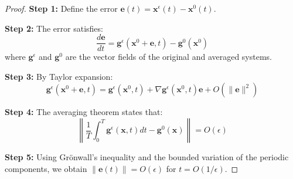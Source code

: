 \documentclass{article}
\begin{document}
\begin{proof}
\textbf{Step 1:} Define the error $\mathbf{e}(t) = \mathbf{x}^\epsilon(t) - \mathbf{x}^0(t)$.

\textbf{Step 2:} The error satisfies:
\begin{equation}
\frac{d\mathbf{e}}{dt} = \mathbf{g}^\epsilon(\mathbf{x}^0 + \mathbf{e}, t) - \mathbf{g}^0(\mathbf{x}^0)
\end{equation}
where $\mathbf{g}^\epsilon$ and $\mathbf{g}^0$ are the vector fields of the original and averaged systems.

\textbf{Step 3:} By Taylor expansion:
\begin{equation}
\mathbf{g}^\epsilon(\mathbf{x}^0 + \mathbf{e}, t) = \mathbf{g}^\epsilon(\mathbf{x}^0, t) + \nabla\mathbf{g}^\epsilon(\mathbf{x}^0, t)\mathbf{e} + O(\|\mathbf{e}\|^2)
\end{equation}

\textbf{Step 4:} The averaging theorem states that:
\begin{equation}
\left\|\frac{1}{T}\int_0^T \mathbf{g}^\epsilon(\mathbf{x}, t) dt - \mathbf{g}^0(\mathbf{x})\right\| = O(\epsilon)
\end{equation}

\textbf{Step 5:} Using Grönwall's inequality and the bounded variation of the periodic components, we obtain $\|\mathbf{e}(t)\| = O(\epsilon)$ for $t = O(1/\epsilon)$.
\end{proof}



\end{document}
